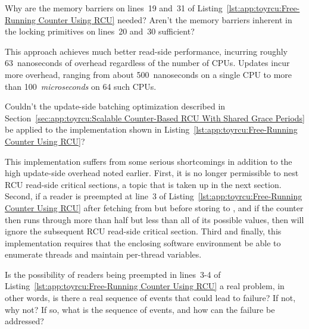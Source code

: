\QuickQuiz{}
	Why are the memory barriers on lines~19 and~31 of
	Listing~\ref{lst:app:toyrcu:Free-Running Counter Using RCU}
	needed?
	Aren't the memory barriers inherent in the locking
	primitives on lines~20 and~30 sufficient?
 \QuickQuizEnd

This approach achieves much better read-side performance, incurring
roughly 63~nanoseconds of overhead regardless of the number of
 CPUs.
Updates incur more overhead, ranging from about 500~nanoseconds on
a single  CPU to more than 100~\emph{microseconds} on 64
such CPUs.

\QuickQuiz{}
	Couldn't the update-side batching optimization described in
	Section~\ref{sec:app:toyrcu:Scalable Counter-Based RCU With Shared Grace Periods}
	be applied to the implementation shown in
	Listing~\ref{lst:app:toyrcu:Free-Running Counter Using RCU}?
 \QuickQuizEnd

This implementation suffers from some serious shortcomings in
addition to the high update-side overhead noted earlier.
First, it is no longer permissible to nest RCU read-side critical
sections, a topic that is taken up in the next section.
Second, if a reader is preempted at line~3 of
Listing~\ref{lst:app:toyrcu:Free-Running Counter Using RCU} after fetching from
 but before storing to ,
and if the  counter then runs through more than half
but less than all of its possible values, then 
will ignore the subsequent RCU read-side critical section.
Third and finally, this implementation requires that the enclosing software
environment be able to enumerate threads and maintain per-thread
variables.

\QuickQuiz{}
	Is the possibility of readers being preempted in
	lines~3-4 of Listing~\ref{lst:app:toyrcu:Free-Running Counter Using RCU}
	a real problem, in other words, is there a real sequence
	of events that could lead to failure?
	If not, why not?
	If so, what is the sequence of events, and how can the
	failure be addressed?
 \QuickQuizEnd

